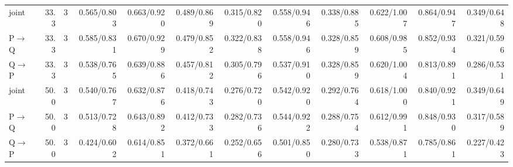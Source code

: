 \documentclass{article}
\begin{document}
\begin{longtable}{lrrrrrrrrrrr}
joint & 33.3 & 3 & 0.565/0.803 & 0.663/0.920 & 0.489/0.869 & 0.315/0.820 & 0.558/0.946 & 0.338/0.885 & 0.622/1.007 & 0.864/0.947 & 0.349/0.648 \\
P$\to$Q & 33.3 & 3 & 0.585/0.831 & 0.670/0.929 & 0.479/0.852 & 0.322/0.838 & 0.558/0.946 & 0.328/0.859 & 0.608/0.985 & 0.852/0.934 & 0.321/0.596 \\
Q$\to$P & 33.3 & 3 & 0.538/0.765 & 0.639/0.886 & 0.457/0.812 & 0.305/0.796 & 0.537/0.910 & 0.328/0.859 & 0.620/1.004 & 0.813/0.891 & 0.286/0.531 \\
joint & 50.0 & 3 & 0.540/0.767 & 0.632/0.876 & 0.418/0.743 & 0.276/0.720 & 0.542/0.920 & 0.292/0.764 & 0.618/1.000 & 0.840/0.921 & 0.349/0.649 \\
P$\to$Q & 50.0 & 3 & 0.513/0.728 & 0.643/0.892 & 0.412/0.733 & 0.282/0.736 & 0.544/0.922 & 0.288/0.754 & 0.612/0.991 & 0.848/0.930 & 0.317/0.589 \\
Q$\to$P & 50.0 & 3 & 0.424/0.602 & 0.614/0.851 & 0.372/0.661 & 0.252/0.656 & 0.501/0.850 & 0.280/0.733 & 0.538/0.871 & 0.785/0.861 & 0.227/0.423 \\
\bottomrule\end{longtable}
\clearpage
\end{document}
